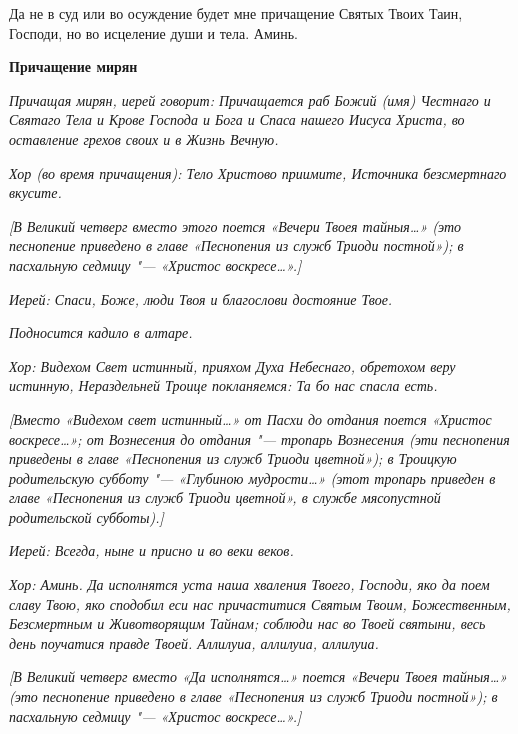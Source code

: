   Да не в суд или во осуждение будет мне причащение Святых Твоих Таин,
Господи, но во исцеление души и тела. Аминь.



 

\bfseries Причащение мирян\normalfont{}


 \itshape Причащая мирян, иерей говорит:\normalfont{} Причащается раб Божий \itshape (имя)\normalfont{}
Честнаго и Святаго Тела и Крове Господа и Бога и Спаса нашего Иисуса
Христа, во оставление грехов своих и в Жизнь Вечную.


 \itshape Хор (во время причащения)\normalfont{}: Тело Христово приимите, Источника
безсмертнаго вкусите.


 \itshape [В Великий четверг вместо этого поется «Вечери Твоея тайныя…» (это
песнопение приведено в главе «Песнопения из служб Триоди постной»); в
пасхальную седмицу "--- «Христос воскресе…».]\normalfont{}


 \itshape Иерей:\normalfont{} Спаси, Боже, люди Твоя и благослови достояние Твое.


 \itshape Подносится кадило в алтаре.\normalfont{}


 \itshape Хор:\normalfont{} Видехом Свет истинный, прияхом Духа Небеснаго, обретохом
веру истинную, Нераздельней Троице покланяемся: Та бо нас спасла
есть.


 \itshape [Вместо «Видехом свет истинный…» от Пасхи до отдания поется «Христос
воскресе…»; от Вознесения до отдания "--- тропарь Вознесения (эти песнопения
приведены в главе «Песнопения из служб Триоди цветной»); в Троицкую
родительскую субботу "--- «Глубиною мудрости…» (этот тропарь приведен в
главе «Песнопения из служб Триоди цветной», в службе мясопустной
родительской субботы).]\normalfont{}


 \itshape Иерей:\normalfont{} Всегда, ныне и присно и во веки веков.


 \itshape Хор:\normalfont{} Аминь. Да исполнятся уста наша хваления Твоего, Господи, яко да
поем славу Твою, яко сподобил еси нас причаститися Святым Твоим,
Божественным, Безсмертным и Животворящим Тайнам; соблюди нас во
Твоей святыни, весь день поучатися правде Твоей. Аллилуиа, аллилуиа,
аллилуиа.


 \itshape [В Великий четверг вместо «Да исполнятся…» поется «Вечери Твоея
тайныя…» (это песнопение приведено в главе «Песнопения из служб Триоди
постной»); в пасхальную седмицу "--- «Христос воскресе…».]\normalfont{}



 

